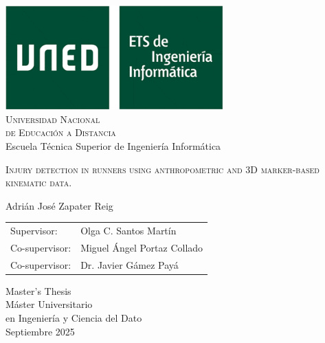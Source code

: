 \begin{titlepage}
\centering
	\includegraphics[height=4cm]{ images/logo_informatica_s.png}\\
	\vspace{0.25cm}
 	{\Large \textsc{{Universidad Nacional\\ de Educación a Distancia}}}\\
 	\vspace{0.8cm}
	{\Large Escuela Técnica Superior de Ingeniería Informática}\\
	\vspace{0.25cm}
	\vspace{1.5cm}
    \begin{spacing}{2}
  	{\textsc{\Huge Injury detection in runners using anthropometric and 3D marker-based kinematic data.}}
    \end{spacing}
	\vfill
	{\Large Adrián José Zapater Reig}\\
	\vspace{0.3cm}
	\begin{tabular}{ll}

	\large Supervisor: & \large Olga C. Santos Martín\\
	\large Co-supervisor: & \large Miguel Ángel Portaz Collado\\
        \large Co-supervisor: & \large Dr. Javier Gámez Payá 
	\end{tabular}
	
	\vfill
	{\Large Master's Thesis}\\
	\vspace{0.3cm}
	{\large Máster Universitario\\ en Ingeniería y Ciencia del Dato}\\
	\vspace{0.25cm}
	Septiembre 2025
\end{titlepage}